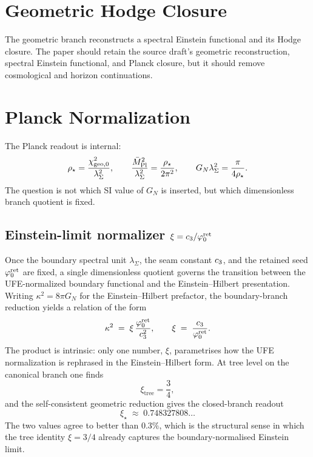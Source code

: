 \documentclass[11pt,a4paper]{article}
\begin{document}
\section{Geometric Hodge Closure}

The geometric branch reconstructs a spectral Einstein functional and its Hodge closure. The paper
should retain the source draft's geometric reconstruction, spectral Einstein functional, and Planck
closure, but it should remove cosmological and horizon continuations.

\section{Planck Normalization}

The Planck readout is internal:
\[
\rho_\star=\frac{\chi_{\mathrm{geo},0}^2}{\lambda_\Sigma^2},
\qquad
\frac{\bar M_{\mathrm{Pl}}^2}{\lambda_\Sigma^2}=\frac{\rho_\star}{2\pi^2},
\qquad
G_N\lambda_\Sigma^2=\frac{\pi}{4\rho_\star}.
\]
The question is not which SI value of $G_N$ is inserted, but which dimensionless branch quotient is
fixed.

\subsection{Einstein-limit normalizer \texorpdfstring{$\xi=c_3/\varphi_0^{\mathrm{ret}}$}{xi = c3/phi0}}
\label{ssec:einstein-limit-normalizer}

Once the boundary spectral unit $\lambda_\Sigma$, the seam constant $c_3$, and the retained
seed $\varphi_0^{\mathrm{ret}}$ are fixed, a single dimensionless quotient governs the transition between the
UFE-normalized boundary functional and the Einstein--Hilbert presentation. Writing
$\kappa^2=8\pi G_N$ for the Einstein--Hilbert prefactor, the boundary-branch reduction yields a
relation of the form
\begin{equation}
\label{eq:kappa-xi}
\kappa^2 \;=\; \xi\,\frac{\varphi_0^{\mathrm{ret}}}{c_3^2},
\qquad
\xi \;=\; \frac{c_3}{\varphi_0^{\mathrm{ret}}}.
\end{equation}
The product is intrinsic: only one number, $\xi$, parametrises how the UFE normalization is
rephrased in the Einstein--Hilbert form. At tree level on the canonical branch one finds
\[
\xi_{\mathrm{tree}}=\frac{3}{4},
\]
and the self-consistent geometric reduction gives the closed-branch readout
\[
\xi_\star \;\approx\; 0.748327808\ldots
\]
The two values agree to better than $0.3\%$, which is the structural sense in which the tree
identity $\xi=3/4$ already captures the boundary-normalised Einstein limit.
\end{document}
